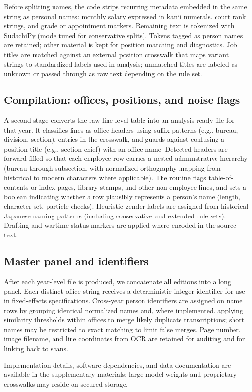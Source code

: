 Before splitting names, the code strips recurring metadata embedded in the same string as personal names: monthly salary expressed in kanji numerals, court rank strings, and grade or appointment markers. Remaining text is tokenized with SudachiPy (mode tuned for conservative splits). Tokens tagged as person names are retained; other material is kept for position matching and diagnostics. Job titles are matched against an external position crosswalk that maps variant strings to standardized labels used in analysis; unmatched titles are labeled as unknown or passed through as raw text depending on the rule set.

\subsection{Compilation: offices, positions, and noise flags}

A second stage converts the raw line-level table into an analysis-ready file for that year. It classifies lines as office headers using suffix patterns (e.g., bureau, division, section), entries in the crosswalk, and guards against confusing a position title (e.g., section chief) with an office name. Detected headers are forward-filled so that each employee row carries a nested administrative hierarchy (bureau through subsection, with normalized orthography mapping from historical to modern characters where applicable). The routine flags table-of-contents or index pages, library stamps, and other non-employee lines, and sets a boolean indicating whether a row plausibly represents a person's name (length, character set, particle checks). Heuristic gender labels are assigned from historical Japanese naming patterns (including conservative and extended rule sets). Drafting and wartime status markers are applied where encoded in the source text.

\subsection{Master panel and identifiers}

After each year-level file is produced, we concatenate all editions into a long panel. Each distinct office string receives a deterministic integer identifier for use in fixed-effects specifications. Cross-year person identifiers are assigned on name rows by grouping identical normalized names and, where implemented, applying similarity thresholds within offices to merge likely duplicate transcriptions; short names may be restricted to exact matching to limit false merges. Page number, image filename, and line coordinates from OCR are retained for auditing and for linking back to scans.

Implementation details, software dependencies, and data documentation are available in the supplementary materials; large model weights and proprietary crosswalks may reside on secured storage.

